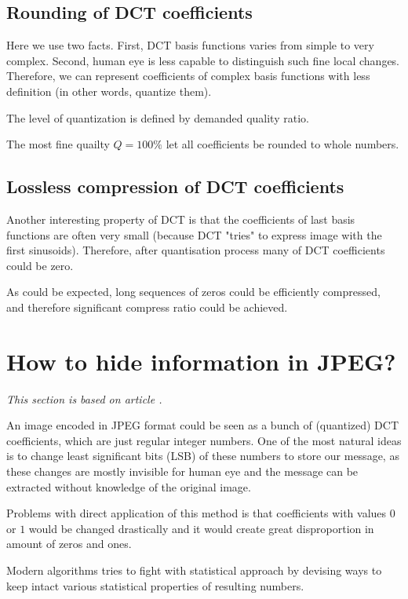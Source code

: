 \subsection{Rounding of DCT coefficients}

Here we use two facts. First, DCT basis functions varies from simple
to very complex. Second, human eye is less capable to distinguish such
fine local changes. Therefore, we can represent coefficients of complex
basis functions with less definition (in other words, quantize them).

The level of quantization is defined by demanded quality ratio.

The most fine quailty $Q=100\%$ let all coefficients be rounded to whole numbers.

\subsection{Lossless compression of DCT coefficients}

Another interesting property of DCT is that the coefficients
of last basis functions are often very small (because DCT "tries"
to express image with the first sinusoids). Therefore, after
quantisation process many of DCT coefficients could be zero.

As could be expected, long sequences of zeros could be efficiently
compressed, and therefore significant compress ratio could be achieved.


\section{How to hide information in JPEG?}

\textit{This section is based on article \cite{liu2008high}.}

An image encoded in JPEG format could be seen as a bunch of (quantized)
DCT coefficients, which are just regular integer numbers. One of the
most natural ideas is to change least significant bits (LSB) of these
numbers to store our message, as these changes are mostly invisible
for human eye and the message can be extracted without knowledge of
the original image.

Problems with direct application of this method is that coefficients with values
$0$ or $1$ would be changed drastically and it would create great disproportion
in amount of zeros and ones.

Modern algorithms tries to fight with statistical approach by devising ways to
keep intact various statistical properties of resulting numbers. 

